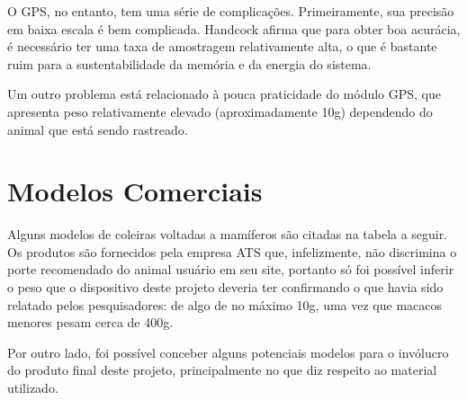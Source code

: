 O GPS, no entanto, tem uma série de complicações. Primeiramente, sua precisão em baixa escala é bem complicada. Handcock afirma que para obter boa acurácia, é necessário ter uma taxa de amostragem relativamente alta, o que é bastante ruim para a sustentabilidade da memória e da energia do sistema.

Um outro problema está relacionado à pouca praticidade do módulo GPS, que apresenta peso relativamente elevado (aproximadamente 10g) dependendo do animal que está sendo rastreado.

\section{Modelos Comerciais}
Alguns modelos de coleiras voltadas a mamíferos são citadas na tabela a seguir. Os produtos são fornecidos pela empresa ATS que, infelizmente, não discrimina o porte recomendado do animal usuário em seu site, portanto só foi possível inferir o peso que o dispositivo deste projeto deveria ter confirmando o que havia sido relatado pelos pesquisadores: de algo de no máximo 10g, uma vez que macacos menores pesam cerca de 400g.

Por outro lado, foi possível conceber alguns potenciais modelos para o invólucro do produto final deste projeto, principalmente no que diz respeito ao material utilizado.

